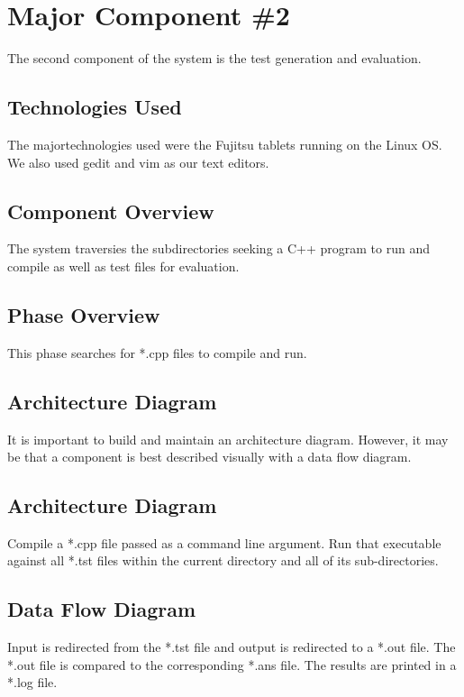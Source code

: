 \section{Major Component \#2 }
The second component of the system is the test generation and evaluation. 

\subsection{Technologies  Used}
The majortechnologies used were the Fujitsu tablets running on the Linux OS. We also used gedit and vim as our text editors.

\subsection{Component  Overview}
The system traversies the subdirectories seeking a C++ program to run and compile as well as test files for evaluation.

\subsection{Phase Overview}
This phase searches for *.cpp files to compile and run.

\subsection{ Architecture  Diagram}
It is important to build and maintain an architecture diagram.  However, it may 
be that a component is best described visually with a data flow diagram. 


\subsection{ Architecture  Diagram}
Compile a *.cpp file passed as a command line argument. Run that executable against all *.tst files within the current directory and all of its sub-directories.

\subsection{Data Flow Diagram}
Input is redirected from the *.tst file and output is redirected to a *.out file. The *.out file is compared to the corresponding *.ans file. The results are printed in a *.log file.


